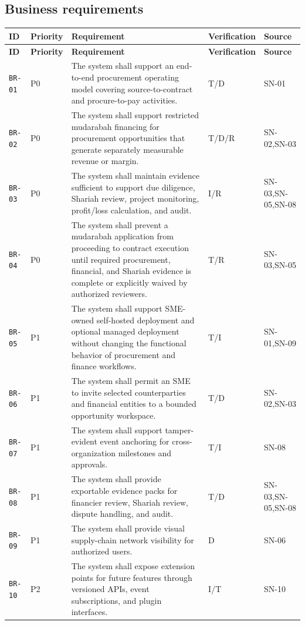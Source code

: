 \documentclass[11pt,a4paper]{article}
\begin{document}
\subsection{Business requirements}\label{sec:business-reqs}
\begin{footnotesize}
\begin{longtable}{@{}p{}p{}p{}p{}p{}@{}}
\rowcolor{gray!18}\textbf{ID} & \textbf{Priority} & \textbf{Requirement} & \textbf{Verification} & \textbf{Source} \\ \hline
\endfirsthead
\rowcolor{gray!18}\textbf{ID} & \textbf{Priority} & \textbf{Requirement} & \textbf{Verification} & \textbf{Source} \\ \hline
\endhead
\texttt{BR-01} & P0 & The system shall support an end-to-end procurement operating model covering source-to-contract and procure-to-pay activities. & T/D & SN-01 \\ \hline
\texttt{BR-02} & P0 & The system shall support restricted mudarabah financing for procurement opportunities that generate separately measurable revenue or margin. & T/D/R & SN-02,SN-03 \\ \hline
\texttt{BR-03} & P0 & The system shall maintain evidence sufficient to support due diligence, Shariah review, project monitoring, profit/loss calculation, and audit. & I/R & SN-03,SN-05,SN-08 \\ \hline
\texttt{BR-04} & P0 & The system shall prevent a mudarabah application from proceeding to contract execution until required procurement, financial, and Shariah evidence is complete or explicitly waived by authorized reviewers. & T/R & SN-03,SN-05 \\ \hline
\texttt{BR-05} & P1 & The system shall support SME-owned self-hosted deployment and optional managed deployment without changing the functional behavior of procurement and finance workflows. & T/I & SN-01,SN-09 \\ \hline
\texttt{BR-06} & P1 & The system shall permit an SME to invite selected counterparties and financial entities to a bounded opportunity workspace. & T/D & SN-02,SN-03 \\ \hline
\texttt{BR-07} & P1 & The system shall support tamper-evident event anchoring for cross-organization milestones and approvals. & T/I & SN-08 \\ \hline
\texttt{BR-08} & P1 & The system shall provide exportable evidence packs for financier review, Shariah review, dispute handling, and audit. & T/D & SN-03,SN-05,SN-08 \\ \hline
\texttt{BR-09} & P1 & The system shall provide visual supply-chain network visibility for authorized users. & D & SN-06 \\ \hline
\texttt{BR-10} & P2 & The system shall expose extension points for future features through versioned APIs, event subscriptions, and plugin interfaces. & I/T & SN-10 \\ \hline
\end{longtable}
\end{footnotesize}
\end{document}
